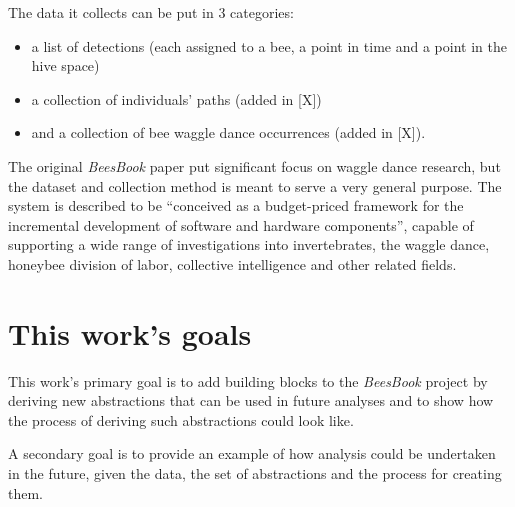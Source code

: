 The data it collects can be put in 3 categories: 
\begin{itemize}
    \item a list of detections (each assigned to a bee, a point in time and a
    point in the hive space) 
    \item a collection of individuals’ paths (added in [X])
    \item and a collection of bee waggle dance occurrences (added in [X]). 
\end{itemize}

The original \textit{BeesBook} paper put significant focus on waggle dance
research, but the dataset and collection method is meant to serve a very general
purpose. The system is described to be “conceived as a budget-priced framework
for the incremental development of software and hardware components”, capable of
supporting a wide range of investigations into invertebrates, the waggle dance,
honeybee division of labor, collective intelligence and other related fields.



\section{This work's goals}
This work’s primary goal is to add building blocks to the \textit{BeesBook}
project by deriving new abstractions that can be used in future analyses and to
show how the process of deriving such abstractions could look like.

A secondary goal is to provide an example of how analysis could be undertaken in
the future, given the data, the set of abstractions and the process for creating
them. 